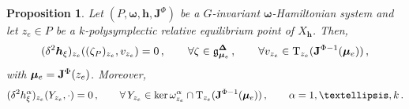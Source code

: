 \documentclass[11pt]{article}
\theoremstyle{plain}
\newtheorem{proposition}[theorem]{Proposition}
\theoremstyle{definition}
\newcommand{\T}{\mathrm{T}}
\newcommand{\bomega}{{\boldsymbol{\omega}}}
\newcommand{\bh}{{\boldsymbol{h}}}
\numberwithin{equation}{section}
\begin{document}
\begin{proposition}
\label{Prop::GaugeDir}
     Let $(P,\bomega,\bh,\mathbf{J}^\Phi)$ be a $G$-invariant $\bomega$-Hamiltonian system and let $z_e\in P$ be a $k$-polysymplectic relative equilibrium point of $X_{\bh}$. Then,
    \[ (\delta^2\boldsymbol{h}_\xi)_{z_e}((\zeta_P)_{z_e},v_{z_e})=0\,,\qquad \forall \zeta\in \mathfrak{g}^{\boldsymbol{\Delta}}_{\boldsymbol{\mu}_e}\,,\qquad \forall v_{z_e}\in \T_{z_e}({\bf J}^{\Phi-1}({\bm \mu}_e))\,,
    \]
    with ${\bm \mu}_e={\bf J}^{\Phi}(z_e)$. Moreover,
     \begin{equation}\label{eq:SecDeg} (\delta^2{h}^\alpha_\xi)_{z_e}(Y_{z_e},\cdot)=0\,,\qquad \forall \,Y_{z_e}\in \ker \omega_{z_e}^\alpha\cap \T_{z_e}({\bf J}^{\Phi-1}(\bm\mu_e))\,,\qquad \alpha=1,\ldots,k\,.
    \end{equation}
\end{proposition}
\end{document}
